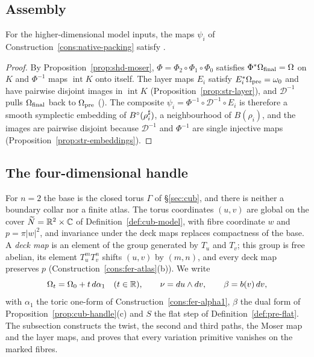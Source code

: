 \subsection{Assembly}\label{sec:shd-proof}
\begin{theorem}\label{thm:shd-packing}
For the higher-dimensional model inputs, the maps $\psi_i$ of Construction~\ref{cons:native-packing}
satisfy .
\end{theorem}
\begin{proof}
By Proposition~\ref{prop:shd-moser}, $\Phi=\Phi_2\circ\Phi_1\circ\Phi_0$ satisfies $\Phi^*\Omega_{\rm final}=\Omega$ on $K$ and
$\Phi^{-1}$ maps $\operatorname{int}K$ onto itself. The layer maps $E_i$ satisfy $E_i^*\Omega_{\rm pre}=\omega_0$ and have
pairwise disjoint images in $\operatorname{int}K$ (Proposition~\ref{prop:str-layer}), and $\mathcal D^{-1}$ pulls
$\Omega_{\rm final}$ back to $\Omega_{\rm pre}$ (). The composite
$\psi_i=\Phi^{-1}\circ\mathcal D^{-1}\circ E_i$ is therefore a smooth symplectic embedding of $B^{\circ}(\rho_i^\sharp)$, a
neighbourhood of $B(\rho_i)$, and the images are pairwise disjoint because $\mathcal D^{-1}$ and $\Phi^{-1}$ are single
injective maps (Proposition~\ref{prop:str-embeddings}).
\end{proof}

\subsection{The four-dimensional handle}\label{sec:shd-four}

For $n=2$ the base is the closed torus $\Gamma$ of \S\ref{sec:cub}, and there is neither a boundary collar nor a
finite atlas. The torus coordinates $(u,v)$ are global on the cover $\widetilde N=\mathbb{R}^2\times\mathbb{C}$ of
Definition~\ref{def:cub-model}, with fibre coordinate $w$ and $p=\pi|w|^2$, and invariance under the deck maps
replaces compactness of the base. A \emph{deck map} is an element of the group generated by $T_u$ and $T_v$; this group
is free abelian, its element $T_u^mT_v^n$ shifts $(u,v)$ by $(m,n)$, and every deck map preserves $p$
(Construction~\ref{cons:fer-atlas}(b)). We write
\[
 \Omega_t=\Omega_0+t\,d\alpha_1\quad(t\in\mathbb{R}),\qquad \nu=du\wedge dv,\qquad \beta=b(v)\,dv,
\]
with $\alpha_1$ the toric one-form of Construction~\ref{cons:fer-alpha1}, $\beta$ the dual form of
Proposition~\ref{prop:cub-handle}(c) and $S$ the flat step of Definition~\ref{def:pre-flat}.
The subsection constructs the twist, the second and third paths, the Moser map and the layer maps, and proves
that every variation primitive vanishes on the marked fibres.

